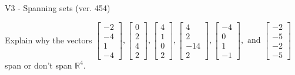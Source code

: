 \begin{exercise}
  \begin{exerciseTitle}V3 - Spanning sets (ver. 454)\end{exerciseTitle}
  \begin{exerciseStatement}
    Explain why the vectors \(\left[\begin{array}{r}
-2 \\
-4 \\
1 \\
-4
\end{array}\right] , \left[\begin{array}{r}
0 \\
2 \\
4 \\
2
\end{array}\right] , \left[\begin{array}{r}
4 \\
1 \\
0 \\
2
\end{array}\right] , \left[\begin{array}{r}
4 \\
2 \\
-14 \\
2
\end{array}\right] , \left[\begin{array}{r}
-4 \\
0 \\
1 \\
-1
\end{array}\right] , \text{ and } \left[\begin{array}{r}
-2 \\
-5 \\
-2 \\
-5
\end{array}\right]\) span or don't span \(\mathbb{R}^4\). 
	



\end{exerciseStatement}
\end{exercise}

